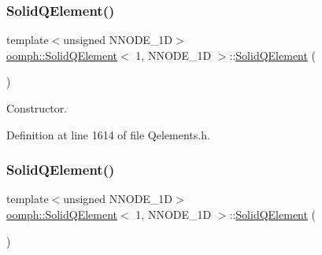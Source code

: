 \subsubsection{\texorpdfstring{Solid\+Q\+Element()}{SolidQElement()}\hspace{0.1cm}{\footnotesize\ttfamily [1/2]}}
{\footnotesize\ttfamily template$<$unsigned N\+N\+O\+D\+E\+\_\+1D$>$ \\
\hyperlink{classoomph_1_1SolidQElement}{oomph\+::\+Solid\+Q\+Element}$<$ 1, N\+N\+O\+D\+E\+\_\+1D $>$\+::\hyperlink{classoomph_1_1SolidQElement}{Solid\+Q\+Element} (\begin{DoxyParamCaption}{ }\end{DoxyParamCaption})\hspace{0.3cm}{\ttfamily [inline]}}



Constructor. 



Definition at line 1614 of file Qelements.\+h.

\mbox{\label{classoomph_1_1SolidQElement_3_011_00_01NNODE__1D_01_4_a898cb4736295a43a4df5e4a12cb694c7}} 
\subsubsection{\texorpdfstring{Solid\+Q\+Element()}{SolidQElement()}\hspace{0.1cm}{\footnotesize\ttfamily [2/2]}}
{\footnotesize\ttfamily template$<$unsigned N\+N\+O\+D\+E\+\_\+1D$>$ \\
\hyperlink{classoomph_1_1SolidQElement}{oomph\+::\+Solid\+Q\+Element}$<$ 1, N\+N\+O\+D\+E\+\_\+1D $>$\+::\hyperlink{classoomph_1_1SolidQElement}{Solid\+Q\+Element} (\begin{DoxyParamCaption}\item[{const \hyperlink{classoomph_1_1SolidQElement}{Solid\+Q\+Element}$<$ 1, N\+N\+O\+D\+E\+\_\+1D $>$ \&}]{ }\end{DoxyParamCaption})\hspace{0.3cm}{\ttfamily [inline]}}



